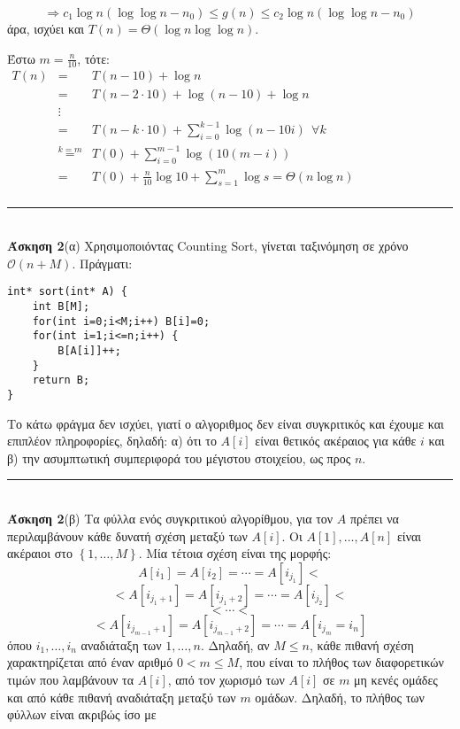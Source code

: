 \documentclass[12pt]{article}
\newcommand\en[1]{\latintext #1\greektext}
\newcommand\bigOh{\mathcal{O}}
\newenvironment{i_enum}{
\begin{enumerate}[label=(\roman{*})]
  \setlength{\itemsep}{0pt}
  \setlength{\parskip}{0pt}
  \setlength{\parsep}{0pt}
}{\end{enumerate}}
\newcommand{\HRule}{\rule{\linewidth}{0.1mm}}
\begin{document}
\begin{i_enum}
$$\Rightarrow c_1\log n\left(\log\log n-n_0\right)\leq g\left(n\right)\leq c_2\log n\left(\log\log n-n_0\right)$$
άρα, ισχύει και $T\left(n\right)=\Theta\left(\log n\log\log n\right)$.
\item Έστω $m=\frac{n}{10}$, τότε:\\
$\begin{array}{lcl}T\left(n\right)
&=&T\left(n-10\right)+\log n\\
&=&T\left(n-2\cdot10\right)+\log\left(n-10\right)+\log n\\
&\vdots&\\
&=&T\left(n-k\cdot10\right)+\sum_{i=0}^{k-1}\log\left(n-10i\right)\ \ \forall k\\
&\overset{k=m}{=}&T\left(0\right)+\sum_{i=0}^{m-1}\log\left(10\left(m-i\right)\right)\\
&=&T\left(0\right)+\frac{n}{10}\log10+\sum_{s=1}^m\log s=\Theta\left(n\log n\right)\\
\end{array}$\\
\end{i_enum}
\HRule\\
{\bf Άσκηση 2}(α) Χρησιμοποιόντας \en{Counting Sort}, γίνεται ταξινόμηση σε χρόνο $\bigOh\left(n+M\right)$. Πράγματι:
\latintext
\begin{lstlisting}
int* sort(int* A) {
	int B[M];
	for(int i=0;i<M;i++) B[i]=0;
	for(int i=1;i<=n;i++) {
		B[A[i]]++;
	}
	return B;
}
\end{lstlisting}
\greektext
Το κάτω φράγμα δεν ισχύει, γιατί ο αλγοριθμος δεν είναι συγκριτικός και έχουμε και επιπλέον πληροφορίες, δηλαδή: α) ότι το $A\left[i\right]$ είναι θετικός ακέραιος για κάθε $i$ και β) την ασυμπτωτική συμπεριφορά του μέγιστου στοιχείου, ως προς $n$.\\
\HRule\\
{\bf Άσκηση 2}(β) Τα φύλλα ενός συγκριτικού αλγορίθμου, για τον $A$ πρέπει να περιλαμβάνουν κάθε δυνατή σχέση μεταξύ των $A[i]$. Οι $A[1],\ldots,A[n]$ είναι ακέραιοι στο $\left\{1,\ldots,M\right\}$. Μία τέτοια σχέση είναι της μορφής:
$$A[i_1]=A[i_2]=\cdots=A[i_{j_1}]<$$
$$<A[i_{j_1+1}]=A[i_{j_1+2}]=\cdots=A[i_{j_2}]<$$
$$<\cdots<$$
$$<A[i_{j_{m-1}+1}]=A[i_{j_{m-1}+2}]=\cdots=A[i_{j_m}=i_n]$$
όπου $i_1,\ldots,i_n$ αναδιάταξη των $1,\ldots,n$. Δηλαδή, αν $M\leq n$, κάθε πιθανή σχέση χαρακτηρίζεται από έναν αριθμό $0<m\leq M$, που είναι το πλήθος των διαφορετικών τιμών που λαμβάνουν τα $A[i]$, από τον χωρισμό των $A[i]$ σε $m$ μη κενές ομάδες και από κάθε πιθανή αναδιάταξη μεταξύ των $m$ ομάδων. Δηλαδή, το πλήθος των φύλλων είναι ακριβώς ίσο με
\end{document}
